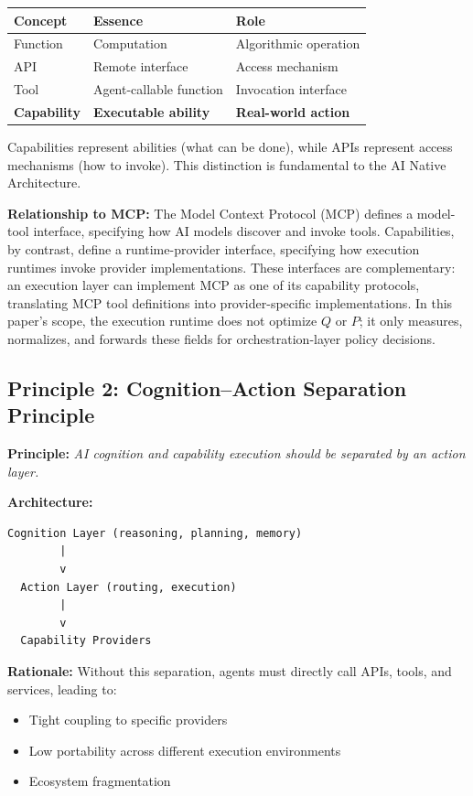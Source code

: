\begin{center}
\begin{tabular}{lll}
\toprule
\textbf{Concept} & \textbf{Essence} & \textbf{Role} \\
\midrule
Function & Computation & Algorithmic operation \\
API & Remote interface & Access mechanism \\
Tool & Agent-callable function & Invocation interface \\
\textbf{Capability} & \textbf{Executable ability} & \textbf{Real-world action} \\
\bottomrule
\end{tabular}
\end{center}

Capabilities represent abilities (what can be done), while APIs represent access mechanisms (how to invoke). This distinction is fundamental to the AI Native Architecture.

\textbf{Relationship to MCP:} The Model Context Protocol (MCP) defines a model-tool interface, specifying how AI models discover and invoke tools. Capabilities, by contrast, define a runtime-provider interface, specifying how execution runtimes invoke provider implementations. These interfaces are complementary: an execution layer can implement MCP as one of its capability protocols, translating MCP tool definitions into provider-specific implementations. In this paper's scope, the execution runtime does not optimize $Q$ or $P$; it only measures, normalizes, and forwards these fields for orchestration-layer policy decisions.

\subsection{Principle 2: Cognition--Action Separation Principle}

\textbf{Principle:} \emph{AI cognition and capability execution should be separated by an action layer.}

\textbf{Architecture:}
\begin{verbatim}
Cognition Layer (reasoning, planning, memory)
        |
        v
  Action Layer (routing, execution)
        |
        v
  Capability Providers
\end{verbatim}

\textbf{Rationale:} Without this separation, agents must directly call APIs, tools, and services, leading to:
\begin{itemize}
    \item Tight coupling to specific providers
    \item Low portability across different execution environments
    \item Ecosystem fragmentation
\end{itemize}

